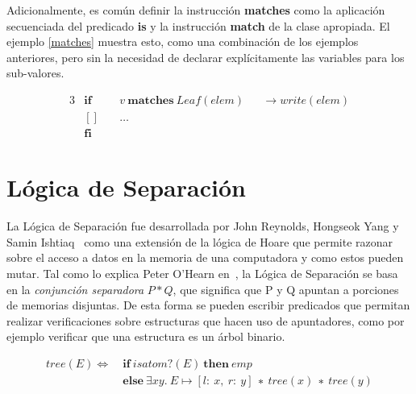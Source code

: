 Adicionalmente, es común definir la instrucción \textbf{matches} 
como la aplicación secuenciada del predicado \textbf{is} y la instrucción
\textbf{match} de la clase apropiada. El ejemplo \ref{matches} muestra esto,
como una combinación de los ejemplos anteriores, pero sin la necesidad de
declarar explícitamente las variables para los sub-valores.

\begin{alignat}{3}
&\boldsymbol{if}\ && v\ \boldsymbol{matches}\ Leaf(elem)         && \rightarrow write(elem) \nonumber \\
&\boldsymbol{[]}\ && \ldots                                                        \label{matches} \\
&\boldsymbol{fi} \nonumber
\end{alignat}


\section{Lógica de Separación}

La Lógica de Separación fue desarrollada por John Reynolds, Hongseok Yang y
Samin Ishtiaq~\cite{seplogpaper1,seplogpaper2,seplogpaper3} como una
extensión de la lógica de Hoare que permite razonar sobre el acceso a datos en
la memoria de una computadora y como estos pueden mutar. Tal como lo explica
Peter O'Hearn en~\cite{separation-logic}, la Lógica de Separación se basa en
la \textit{conjunción separadora} $P * Q$, que significa que P y Q apuntan a
porciones de memorias disjuntas. De esta forma se pueden escribir predicados
que permitan realizar verificaciones sobre estructuras que hacen uso de
apuntadores, como por ejemplo verificar que una estructura es un árbol
binario.

\begin{align}
  tree(E) \Longleftrightarrow\ &\boldsymbol{if}\ isatom?(E)\ \boldsymbol{then}\ emp \label{eq:treesl}\\
             &\boldsymbol{else}\ \exists xy.\ E\mapsto[l:\ x,\ r:\ y]\ ∗\ tree(x)\ ∗\ tree(y) \nonumber
\end{align}

